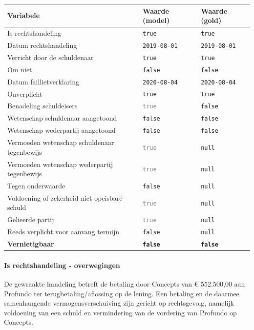 \documentclass[
  dutch,
  a4paper,
]{article}
\begin{document}
\begin{center}
\small
\begin{tabular}{@{}p{7.4cm}p{2.6cm}p{2.6cm}@{}}
\toprule
Variabele & Waarde (model) & Waarde (gold) \\
\midrule
Is rechtshandeling & \texttt{true} & \texttt{true} \\
Datum rechtshandeling & \texttt{2019-08-01} & \texttt{2019-08-01} \\
Verricht door de schuldenaar & \texttt{true} & \texttt{true} \\
Om niet & \texttt{false} & \texttt{false} \\
Datum faillietverklaring & \texttt{2020-08-04} & \texttt{2020-08-04} \\
Onverplicht & \texttt{true} & \texttt{true} \\
Benadeling schuldeisers & \textcolor{gray}{\texttt{true}} & \texttt{false} \\
Wetenschap schuldenaar aangetoond & \texttt{false} & \texttt{false} \\
Wetenschap wederpartij aangetoond & \texttt{false} & \texttt{false} \\
Vermoeden wetenschap schuldenaar tegenbewijs & \textcolor{gray}{\texttt{true}} & \texttt{null} \\
Vermoeden wetenschap wederpartij tegenbewijs & \textcolor{gray}{\texttt{true}} & \texttt{null} \\
Tegen onderwaarde & \texttt{false} & \texttt{null} \\
Voldoening of zekerheid niet opeisbare schuld & \textcolor{gray}{\texttt{true}} & \texttt{null} \\
Gelieerde partij & \textcolor{gray}{\texttt{true}} & \texttt{null} \\
Reeds verplicht voor aanvang termijn & \texttt{false} & \texttt{null} \\
\textbf{Vernietigbaar} & \textbf{\texttt{false}} & \textbf{\texttt{false}} \\
\bottomrule
\end{tabular}
\end{center}

\paragraph{Is rechtshandeling - overwegingen}\label{is-rechtshandeling---overwegingen-37}

De gewraakte handeling betreft de betaling door Concepts van € 552.500,00 aan Profundo ter terugbetaling/aflossing op de lening. Een betaling en de daarmee samenhangende vermogensverschuiving zijn gericht op rechtsgevolg, namelijk voldoening van een schuld en vermindering van de vordering van Profundo op Concepts.
\end{document}
